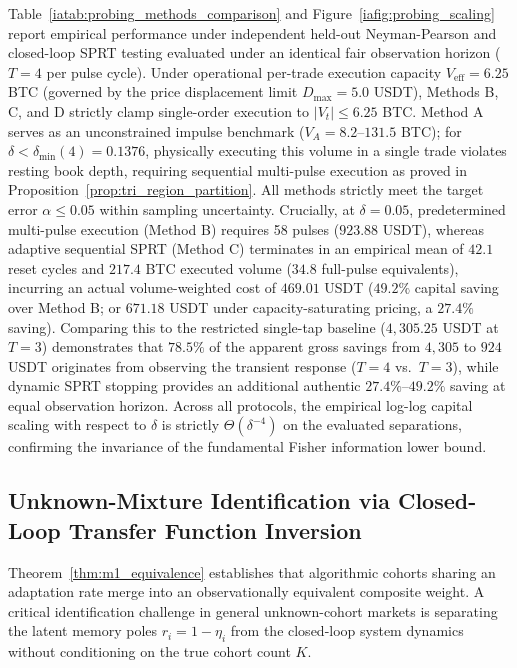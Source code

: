 \documentclass[12pt]{article}
\theoremstyle{definition}
\theoremstyle{remark}
\begin{document}
Table~\ref{iatab:probing_methods_comparison} and Figure~\ref{iafig:probing_scaling} report empirical performance under independent held-out Neyman-Pearson and closed-loop SPRT testing evaluated under an identical fair observation horizon ($T=4$ per pulse cycle). Under operational per-trade execution capacity $V_{\mathrm{eff}} = 6.25$ BTC (governed by the price displacement limit $D_{\max} = 5.0$ USDT), Methods B, C, and D strictly clamp single-order execution to $|V_t| \le 6.25$ BTC. Method A serves as an unconstrained impulse benchmark ($V_A = 8.2$--$131.5$ BTC); for $\delta < \delta_{\min}(4) = 0.1376$, physically executing this volume in a single trade violates resting book depth, requiring sequential multi-pulse execution as proved in Proposition~\ref{prop:tri_region_partition}. All methods strictly meet the target error $\alpha \le 0.05$ within sampling uncertainty. Crucially, at $\delta = 0.05$, predetermined multi-pulse execution (Method B) requires 58 pulses ($923.88$ USDT), whereas adaptive sequential SPRT (Method C) terminates in an empirical mean of $42.1$ reset cycles and $217.4$ BTC executed volume ($34.8$ full-pulse equivalents), incurring an actual volume-weighted cost of $469.01$ USDT ($49.2\%$ capital saving over Method B; or $671.18$ USDT under capacity-saturating pricing, a $27.4\%$ saving). Comparing this to the restricted single-tap baseline ($4{,}305.25$ USDT at $T=3$) demonstrates that $78.5\%$ of the apparent gross savings from $4{,}305$ to $924$ USDT originates from observing the transient response ($T=4$ vs.\ $T=3$), while dynamic SPRT stopping provides an additional authentic $27.4\%$--$49.2\%$ saving at equal observation horizon. Across all protocols, the empirical log-log capital scaling with respect to $\delta$ is strictly $\Theta(\delta^{-4})$ on the evaluated separations, confirming the invariance of the fundamental Fisher information lower bound.

\subsection{Unknown-Mixture Identification via Closed-Loop Transfer Function Inversion}
\label{ia:unknown_mixture_inversion}

Theorem~\ref{thm:m1_equivalence} establishes that algorithmic cohorts sharing an adaptation rate merge into an observationally equivalent composite weight. A critical identification challenge in general unknown-cohort markets is separating the latent memory poles $r_i = 1 - \eta_i$ from the closed-loop system dynamics without conditioning on the true cohort count $K$.
\end{document}
